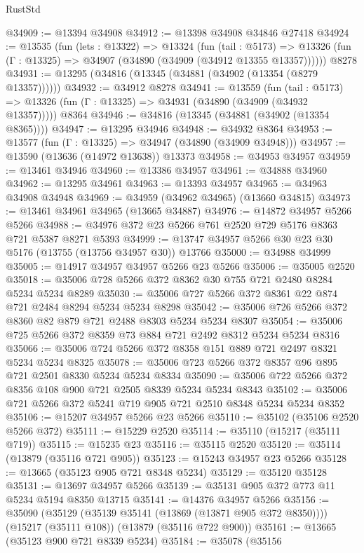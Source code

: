 \begin{lexlean}{RustStd}
\begin{coremodule}
@34909 := @13394 @34908
@34912 := @13398 @34908 @34846 @27418
@34924 := @13535
    (fun (lets : @13322) =>
    @13324
      (fun (tail : @5173) =>
      @13326 (fun (Γ : @13325) => @34907 (@34890 (@34909 (@34912 @13355 @13357))))))
    @8278
@34931 := @13295 (@34816 (@13345 (@34881 (@34902 (@13354 (@8279 @13357))))))
@34932 := @34912 @8278
@34941 := @13559
    (fun (tail : @5173) => @13326 (fun (Γ : @13325) => @34931 (@34890 (@34909 (@34932 @13357)))))
    @8364
@34946 := @34816 (@13345 (@34881 (@34902 (@13354 @8365))))
@34947 := @13295 @34946
@34948 := @34932 @8364
@34953 := @13577 (fun (Γ : @13325) => @34947 (@34890 (@34909 @34948)))
@34957 := @13590 (@13636 (@14972 @13638)) @13373
@34958 := @34953 @34957
@34959 := @13461 @34946
@34960 := @13386 @34957
@34961 := @34888 @34960
@34962 := @13295 @34961
@34963 := @13393 @34957
@34965 := @34963 @34908 @34948
@34969 := @34959 (@34962 @34965) (@13660 @34815)
@34973 := @13461 @34961 @34965 (@13665 @34887)
@34976 := @14872 @34957 @5266 @5266
@34988 := @34976 @372 @23 @5266 @761 @2520 @729 @5176 @8363 @721 @5387 @8271 @5393
@34999 := @13747 @34957 @5266 @30 @23 @30 @5176 (@13755 (@13756 @34957 @30)) @13766
@35000 := @34988 @34999
@35005 := @14917 @34957 @34957 @5266 @23 @5266
@35006 := @35005 @2520
@35018 := @35006 @728 @5266 @372 @8362 @30 @755 @721 @2480 @8284 @5234 @5234 @8289
@35030 := @35006 @727 @5266 @372 @8361 @22 @874 @721 @2484 @8294 @5234 @5234 @8298
@35042 := @35006 @726 @5266 @372 @8360 @82 @879 @721 @2488 @8303 @5234 @5234 @8307
@35054 := @35006 @725 @5266 @372 @8359 @73 @884 @721 @2492 @8312 @5234 @5234 @8316
@35066 := @35006 @724 @5266 @372 @8358 @151 @889 @721 @2497 @8321 @5234 @5234 @8325
@35078 := @35006 @723 @5266 @372 @8357 @96 @895 @721 @2501 @8330 @5234 @5234 @8334
@35090 := @35006 @722 @5266 @372 @8356 @108 @900 @721 @2505 @8339 @5234 @5234 @8343
@35102 := @35006 @721 @5266 @372 @5241 @719 @905 @721 @2510 @8348 @5234 @5234 @8352
@35106 := @15207 @34957 @5266 @23 @5266
@35110 := @35102 (@35106 @2520 @5266 @372)
@35111 := @15229 @2520
@35114 := @35110 (@15217 (@35111 @719))
@35115 := @15235 @23
@35116 := @35115 @2520
@35120 := @35114 (@13879 (@35116 @721 @905))
@35123 := @15243 @34957 @23 @5266
@35128 := @13665 (@35123 @905 @721 @8348 @5234)
@35129 := @35120 @35128
@35131 := @13697 @34957 @5266
@35139 := @35131 @905 @372 @773 @11 @5234 @5194 @8350 @13715
@35141 := @14376 @34957 @5266
@35156 := @35090
    (@35129 (@35139 @35141 (@13869 (@13871 @905 @372 @8350))))
    (@15217 (@35111 @108))
    (@13879 (@35116 @722 @900))
@35161 := @13665 (@35123 @900 @721 @8339 @5234)
@35184 := @35078
    (@35156

\end{coremodule}
\end{lexlean}
